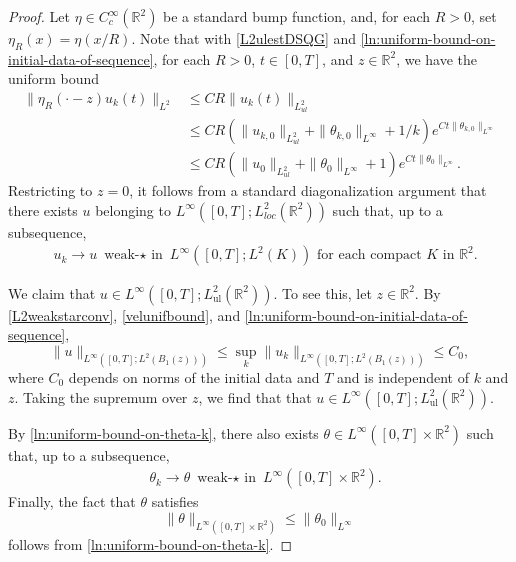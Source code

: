 \documentclass[11pt,reqno,xcolor=svgnames]{amsart}
\def\R{{\mathbb R}}
\theoremstyle{plain}
\theoremstyle{definition}
\theoremstyle{plain}
\theoremstyle{remark}
\begin{document}
\begin{proof}
Let $\eta\in C^{\infty}_c(\R^2)$ be a standard bump function, and, for each $R>0$, set $\eta_R (x)= \eta (x/R)$.  Note that with \eqref{L2ulestDSQG} and \eqref{ln:uniform-bound-on-initial-data-of-sequence}, for each $R>0$, $t\in [0,T]$, and $z\in \R^2$, we have the uniform bound
\begin{equation}\label{velunifbound}
\begin{split}
\| \eta_R(\cdot-z) u_k(t) \|_{L^2} &\leq CR\| u_k(t) \|_{L^2_{ul}} \\
&\leq CR(\| u_{k,0} \|_{L^2_{ul}} + \| \theta_{k,0} \|_{L^{\infty}} + 1/k)e^{Ct \| \theta_{k,0} \|_{L^{\infty}}}\\
&\leq CR(\| u_{0} \|_{L^2_{ul}} + \| \theta_{0} \|_{L^{\infty}} +1)e^{Ct \| \theta_{0} \|_{L^{\infty}}}.
\end{split}
\end{equation}
Restricting to $z=0$, it follows from a standard diagonalization argument that there exists $u$ belonging to $L^{\infty}([0,T]; L_{loc}^2(\R^2))$ such that, up to a subsequence, 
\begin{equation}\label{L2weakstarconv}
\begin{split}
&u_k \rightarrow u \text{ weak-$\star$ in }L^{\infty}([0,T]; L^2(K)) \text{ for each compact $K$ in $\R^2$}.
\end{split}   
\end{equation}

We claim that $u\in L^{\infty}([0,T]; L^2_{\text{ul}}(\R^2))$.  To see this, let $z\in\R^2$. 
By \cref{L2weakstarconv}, \cref{velunifbound}, and \cref{ln:uniform-bound-on-initial-data-of-sequence}, $$\| u \|_{L^{\infty}([0,T];L^2(B_1(z)))} 
\leq \sup_k \| u_k \|_{L^{\infty}([0,T];L^2(B_1(z)))} \leq C_0,$$
where $C_0$ depends on norms of the initial data and $T$ and is independent of $k$ and $z$.  Taking the supremum over $z$, we find that that $u\in L^{\infty}([0,T]; L^2_{\text{ul}}(\R^2))$. 


By \cref{ln:uniform-bound-on-theta-k}, there also exists $\theta\in L^\infty([0,T]\times \R^2)$ such that, up to a subsequence, 
\begin{equation*}
\begin{split}
&\theta_k\rightarrow\theta \text{ weak-$\star$ in }L^{\infty}([0,T]\times \R^2).
\end{split}   
\end{equation*}
Finally, the fact that $\theta$ satisfies
$$\| \theta \|_{L^{\infty}([0,T]\times\R^2)} \leq \| \theta_0 \|_{L^{\infty}}$$
follows from \eqref{ln:uniform-bound-on-theta-k}.
\end{proof}
\end{document}
